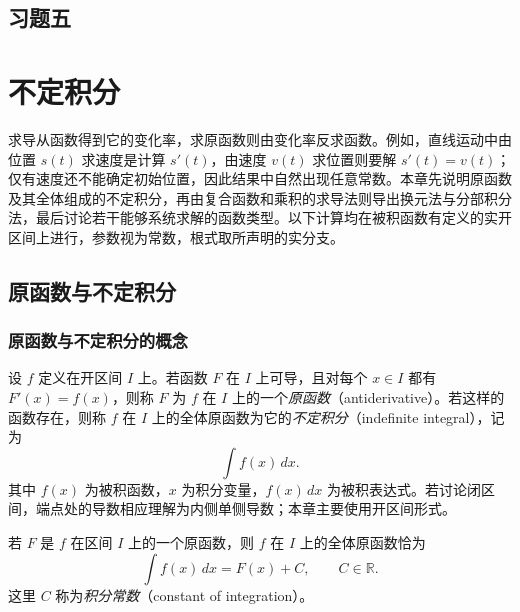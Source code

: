 \documentclass[UTF8,12pt,a4paper,fontset=fandol]{ctexbook}
\begin{document}
\section*{习题五}

\chapter{不定积分}
\label{chap:indefinite-integrals}

求导从函数得到它的变化率，求原函数则由变化率反求函数。例如，直线运动中由位置 $s(t)$ 求速度是计算 $s'(t)$，由速度 $v(t)$ 求位置则要解 $s'(t)=v(t)$；仅有速度还不能确定初始位置，因此结果中自然出现任意常数。本章先说明原函数及其全体组成的不定积分，再由复合函数和乘积的求导法则导出换元法与分部积分法，最后讨论若干能够系统求解的函数类型。以下计算均在被积函数有定义的实开区间上进行，参数视为常数，根式取所声明的实分支。

\section{原函数与不定积分}
\label{sec:antiderivatives-and-indefinite-integrals}

\subsection{原函数与不定积分的概念}
\label{subsec:concepts-of-antiderivatives-and-indefinite-integrals}

\begin{definition}
\label{def:antiderivative-and-indefinite-integral}
设 $f$ 定义在开区间 $I$ 上。若函数 $F$ 在 $I$ 上可导，且对每个 $x\in I$ 都有 $F'(x)=f(x)$，则称 $F$ 为 $f$ 在 $I$ 上的一个\emph{原函数}（antiderivative）。若这样的函数存在，则称 $f$ 在 $I$ 上的全体原函数为它的\emph{不定积分}（indefinite integral），记为
\[
    \int f(x)\,dx.
\]
其中 $f(x)$ 为被积函数，$x$ 为积分变量，$f(x)\,dx$ 为被积表达式。若讨论闭区间，端点处的导数相应理解为内侧单侧导数；本章主要使用开区间形式。
\end{definition}

\begin{theorem}[原函数之间的关系]
\label{thm:antiderivatives-differ-by-constant}
若 $F$ 是 $f$ 在区间 $I$ 上的一个原函数，则 $f$ 在 $I$ 上的全体原函数恰为
\begin{equation}
    \int f(x)\,dx=F(x)+C,\qquad C\in\mathbb{R}.
    \label{eq:indefinite-integral-family}
\end{equation}
这里 $C$ 称为\emph{积分常数}（constant of integration）。
\end{theorem}
\end{document}
